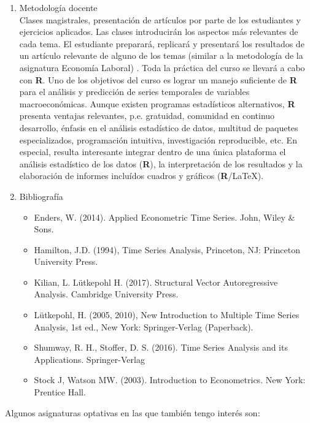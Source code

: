 \documentclass{article}\usepackage[]{graphicx}\usepackage[]{color}
\begin{document}
\begin{enumerate}
  \item Metodología docente\\
  Clases magistrales, presentación de artículos por parte de los estudiantes y ejercicios aplicados. Las clases introducirán los aspectos más relevantes de cada tema. El estudiante preparará, replicará y presentará los resultados de un artículo relevante de alguno de los temas (similar a la metodología de la asignatura Economía Laboral) . Toda la práctica del curso se llevará a cabo con \textbf{\textsf{R}}. Uno de los objetivos del curso es lograr un manejo suficiente de \textbf{\textsf{R}} para el análisis y predicción de series temporales de variables macroeconómicas. Aunque existen programas estadísticos alternativos, \textbf{\textsf{R}} presenta ventajas relevantes, p.e. gratuidad, comunidad en continuo desarrollo, énfasis en el análisis estadístico de datos, multitud de paquetes especializados, programación intuitiva, investigación reproducible, etc. En especial, resulta interesante integrar dentro de una única plataforma el análisis estadístico de los datos (\textbf{\textsf{R}}), la interpretación de los resultados y la elaboración de informes incluídos cuadros y gráficos (\textbf{\textsf{R}}/{\LaTeX}).
  
  \item Bibliografía
  \begin{itemize}
    \item Enders, W. (2014). Applied Econometric Time Series. John, Wiley \& Sons.
    \item Hamilton, J.D. (1994), Time Series Analysis, Princeton, NJ: Princeton University Press.
    \item Kilian, L. Lütkepohl H. (2017). Structural Vector Autoregressive Analysis. Cambridge University Press.
    \item Lütkepohl, H. (2005, 2010), New Introduction to Multiple Time Series Analysis, 1st ed., New York: Springer-Verlag (Paperback).
    \item Shumway, R. H., Stoffer, D. S. (2016). Time Series Analysis and its Applications. Springer-Verlag
    \item Stock J, Watson MW. (2003). Introduction to Econometrics. New York: Prentice Hall. 
  \end{itemize}
\end{enumerate}

Algunos asignaturas optativas en las que también tengo interés son:
\end{document}
